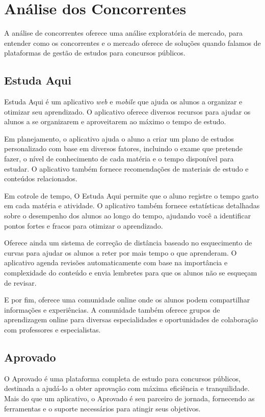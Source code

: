 \section{Análise dos Concorrentes}

A análise de concorrentes oferece uma análise exploratória de mercado, para entender como os concorrentes e o mercado oferece de soluções quando falamos de plataformas de gestão de estudos para concursos públicos.

\subsection{Estuda Aqui}

Estuda Aqui é um aplicativo \textit{web} e \textit{mobile} que ajuda os alunos a organizar e otimizar seu aprendizado. O aplicativo oferece diversos recursos para ajudar os alunos a se organizarem e aproveitarem ao máximo o tempo de estudo.


Em planejamento, o aplicativo  ajuda o aluno a criar um plano de estudos personalizado com base em diversos fatores, incluindo o exame que pretende fazer, o nível de conhecimento de cada matéria e o tempo disponível para estudar. O aplicativo também fornece recomendações de materiais de estudo e conteúdos relacionados. 

Em cotrole de tempo, O Estuda Aqui permite que o aluno registre o tempo gasto em cada matéria e atividade. O aplicativo também fornece estatísticas detalhadas sobre o desempenho dos alunos ao longo do tempo, ajudando você a identificar pontos fortes e fracos para otimizar o aprendizado. 

Oferece ainda um sistema de correção de distância baseado no esquecimento de curvas para ajudar os alunos a reter por mais tempo o que aprenderam. O aplicativo agenda revisões automaticamente com base na importância e complexidade do conteúdo e envia lembretes para que os alunos não se esqueçam de revisar. 

E por fim, oferece uma comunidade online onde os alunos podem compartilhar informações e experiências. A comunidade também oferece grupos de aprendizagem online para diversas especialidades e oportunidades de colaboração com professores e especialistas.

\subsection{Aprovado}

O Aprovado é uma plataforma completa de estudo para concursos públicos, destinada a ajudá-lo a obter aprovação com máxima eficiência e tranquilidade. Mais do que um aplicativo, o Aprovado é seu parceiro de jornada, fornecendo as ferramentas e o suporte necessários para atingir seus objetivos.

